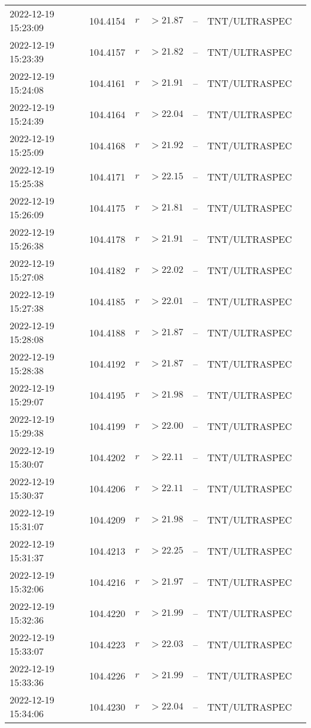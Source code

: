 \documentclass{nature_plusfigure}
\begin{document}
\begin{supplement}
\begin{center}
\begin{longtable}{lllllll}
2022-12-19 15:23:09 & 104.4154 & $r$ & $>21.87$ & -- & TNT/ULTRASPEC &  \\ 
2022-12-19 15:23:39 & 104.4157 & $r$ & $>21.82$ & -- & TNT/ULTRASPEC &  \\ 
2022-12-19 15:24:08 & 104.4161 & $r$ & $>21.91$ & -- & TNT/ULTRASPEC &  \\ 
2022-12-19 15:24:39 & 104.4164 & $r$ & $>22.04$ & -- & TNT/ULTRASPEC &  \\ 
2022-12-19 15:25:09 & 104.4168 & $r$ & $>21.92$ & -- & TNT/ULTRASPEC &  \\ 
2022-12-19 15:25:38 & 104.4171 & $r$ & $>22.15$ & -- & TNT/ULTRASPEC &  \\ 
2022-12-19 15:26:09 & 104.4175 & $r$ & $>21.81$ & -- & TNT/ULTRASPEC &  \\ 
2022-12-19 15:26:38 & 104.4178 & $r$ & $>21.91$ & -- & TNT/ULTRASPEC &  \\ 
2022-12-19 15:27:08 & 104.4182 & $r$ & $>22.02$ & -- & TNT/ULTRASPEC &  \\ 
2022-12-19 15:27:38 & 104.4185 & $r$ & $>22.01$ & -- & TNT/ULTRASPEC &  \\ 
2022-12-19 15:28:08 & 104.4188 & $r$ & $>21.87$ & -- & TNT/ULTRASPEC &  \\ 
2022-12-19 15:28:38 & 104.4192 & $r$ & $>21.87$ & -- & TNT/ULTRASPEC &  \\ 
2022-12-19 15:29:07 & 104.4195 & $r$ & $>21.98$ & -- & TNT/ULTRASPEC &  \\ 
2022-12-19 15:29:38 & 104.4199 & $r$ & $>22.00$ & -- & TNT/ULTRASPEC &  \\ 
2022-12-19 15:30:07 & 104.4202 & $r$ & $>22.11$ & -- & TNT/ULTRASPEC &  \\ 
2022-12-19 15:30:37 & 104.4206 & $r$ & $>22.11$ & -- & TNT/ULTRASPEC &  \\ 
2022-12-19 15:31:07 & 104.4209 & $r$ & $>21.98$ & -- & TNT/ULTRASPEC &  \\ 
2022-12-19 15:31:37 & 104.4213 & $r$ & $>22.25$ & -- & TNT/ULTRASPEC &  \\ 
2022-12-19 15:32:06 & 104.4216 & $r$ & $>21.97$ & -- & TNT/ULTRASPEC &  \\ 
2022-12-19 15:32:36 & 104.4220 & $r$ & $>21.99$ & -- & TNT/ULTRASPEC &  \\ 
2022-12-19 15:33:07 & 104.4223 & $r$ & $>22.03$ & -- & TNT/ULTRASPEC &  \\ 
2022-12-19 15:33:36 & 104.4226 & $r$ & $>21.99$ & -- & TNT/ULTRASPEC &  \\ 
2022-12-19 15:34:06 & 104.4230 & $r$ & $>22.04$ & -- & TNT/ULTRASPEC &  \\ 

\end{longtable}
\end{center}
\end{supplement}
\end{document}
